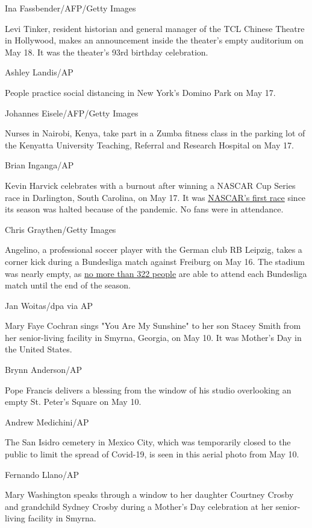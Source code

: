 Ina Fassbender/AFP/Getty Images

Levi Tinker, resident historian and general manager of the TCL Chinese
Theatre in Hollywood, makes an announcement inside the theater's empty
auditorium on May 18. It was the theater's 93rd birthday celebration.

Ashley Landis/AP

People practice social distancing in New York's Domino Park on May 17.

Johannes Eisele/AFP/Getty Images

Nurses in Nairobi, Kenya, take part in a Zumba fitness class in the
parking lot of the Kenyatta University Teaching, Referral and Research
Hospital on May 17.

Brian Inganga/AP

Kevin Harvick celebrates with a burnout after winning a NASCAR Cup
Series race in Darlington, South Carolina, on May 17. It was
\href{https://www.cnn.com/world/live-news/coronavirus-pandemic-05-17-20-intl/h_e8560781fc2629b4a53f4aa0f0623dee}{NASCAR's
first race} since its season was halted because of the pandemic. No fans
were in attendance.

Chris Graythen/Getty Images

Angelino, a professional soccer player with the German club RB Leipzig,
takes a corner kick during a Bundesliga match against Freiburg on May
16. The stadium was nearly empty, as
\href{https://www.cnn.com/2020/05/15/football/bundesliga-return-soccer-safety-spt-intl/index.html}{no
more than 322 people} are able to attend each Bundesliga match until the
end of the season.

Jan Woitas/dpa via AP

Mary Faye Cochran sings "You Are My Sunshine" to her son Stacey Smith
from her senior-living facility in Smyrna, Georgia, on May 10. It was
Mother's Day in the United States.

Brynn Anderson/AP

Pope Francis delivers a blessing from the window of his studio
overlooking an empty St. Peter's Square on May 10.

Andrew Medichini/AP

The San Isidro cemetery in Mexico City, which was temporarily closed to
the public to limit the spread of Covid-19, is seen in this aerial photo
from May 10.

Fernando Llano/AP

Mary Washington speaks through a window to her daughter Courtney Crosby
and grandchild Sydney Crosby during a Mother's Day celebration at her
senior-living facility in Smyrna.

